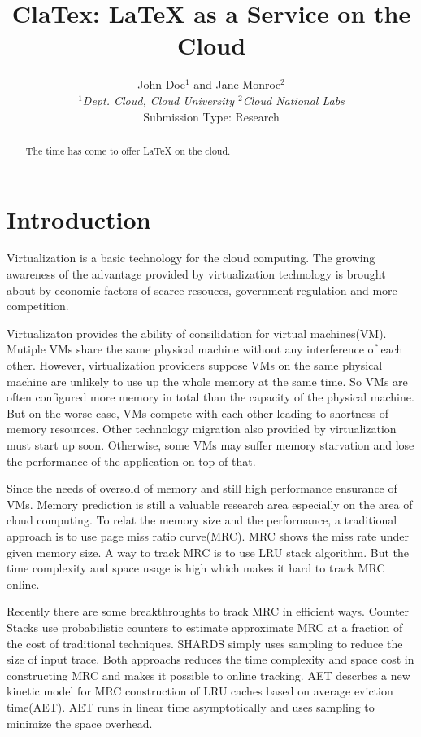 \documentclass[10pt,twocolumn]{article}
\begin{document}
\title{ClaTex: LaTeX as a Service on the Cloud}
\author{John Doe$^1$ and Jane Monroe$^2$ \\
\small {\em  $^1$Dept. Cloud, Cloud University \quad
          $^2$Cloud National Labs} \\ [2mm]
\small Submission Type: Research
}
\date{}
\maketitle

\begin{abstract}
The time has come to offer LaTeX on the cloud.
\end{abstract}

\section{Introduction}
Virtualization is a basic technology for the cloud computing. The growing awareness of the advantage provided by virtualization technology is brought about by economic factors of scarce resouces, government regulation and more competition.

Virtualizaton provides the ability of consilidation for virtual machines(VM). Mutiple VMs share the same physical machine without any interference of each other. However, virtualization providers suppose VMs on the same physical machine are unlikely to use up the whole memory at the same time. So VMs are often configured more memory in total than the capacity of the physical machine. But on the worse case, VMs compete with each other leading to shortness of memory resources. Other technology migration also provided by virtualization must start up soon. Otherwise, some VMs may suffer memory starvation and lose the performance of the application on top of that.

Since the needs of oversold of memory and still high performance ensurance of VMs. Memory prediction is still a valuable research area especially on the area of cloud computing. To relat the memory size and the performance, a traditional approach is to use page miss ratio curve(MRC). MRC shows the miss rate under given memory size. A way to track MRC is to use LRU stack algorithm\cite{Mattson1970Evaluation}. But the time complexity and space usage is high which makes it hard to track MRC online.

Recently there are some breakthroughts to track MRC in efficient ways. Counter Stacks\cite{Wires2014Characterizing} use probabilistic counters to estimate approximate MRC at a fraction of the cost of traditional techniques. SHARDS\cite{shards} simply uses sampling to reduce the size of input trace. Both approachs reduces the time complexity and space cost in constructing MRC and makes it possible to online tracking. AET\cite{aet} descrbes a new kinetic model for MRC construction of LRU caches based on average eviction time(AET). AET runs in linear time asymptotically and uses sampling to minimize the space overhead.
\end{document}
